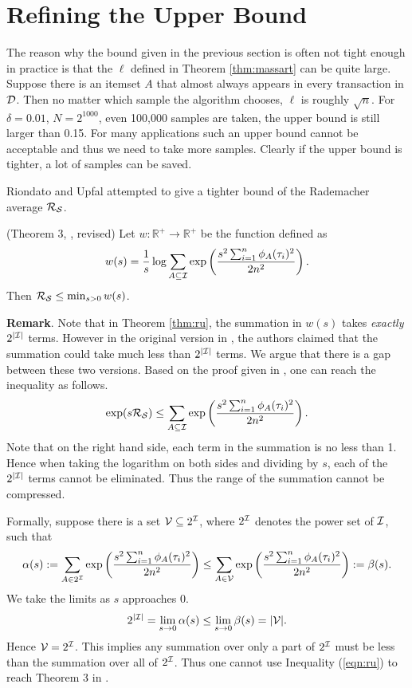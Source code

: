 \documentclass{article}
\begin{document}
\section{Refining the Upper Bound}
\label{sec:refine}
The reason why the bound given in the previous section is often not tight enough in practice is that the $\ell$ defined in Theorem \ref{thm:massart} can be quite large. Suppose there is an itemset $A$ that almost always appears in every transaction in $\mathcal{D}$. Then no matter which sample the algorithm chooses, $\ell$ is roughly $\sqrt{n}$. For $\delta=0.01$, $N = 2^{1000}$, even 100,000 samples are taken, the upper bound is still larger than 0.15. For many applications such an upper bound cannot be acceptable and thus we need to take more samples. Clearly if the upper bound is tighter, a lot of samples can be saved.

Riondato and Upfal \cite{RU15} attempted to give a tighter bound of the Rademacher average $\mathcal{R}_{\mathcal{S}}$. 

\begin{theorem}
\label{thm:ru}
(Theorem 3, \cite{RU15}, revised) Let $w : \mathbb{R}^+ \to \mathbb{R}^+$ be the function defined as
$$w(s) = \frac{1}{s}\log \sum_{A\subseteq\mathcal{I}}\exp\left(\frac{s^2 \sum_{i=1}^n \phi_A(\tau_i)^2}{2n^2}\right).$$
Then $\mathcal{R}_{\mathcal{S}} \leq \min_{s>0} w(s)$.
\end{theorem}

{\bf Remark}. Note that in Theorem \ref{thm:ru}, the summation in $w(s)$ takes \emph{exactly} $2^{|\mathcal{I}|}$ terms. However in the original version in \cite{RU15}, the authors claimed that the summation could take much less than $2^{|\mathcal{I}|}$ terms. We argue that there is a gap between these two versions. Based on the proof given in \cite{RU15}, one can reach the inequality as follows.
\begin{equation}
\label{eqn:ru}\exp(s\mathcal{R}_{\mathcal{S}}) \leq \sum_{A\subseteq\mathcal{I}}\exp\left(\frac{s^2\sum_{i=1}^n \phi_A(\tau_i)^2}{2n^2}\right).
\end{equation}
Note that on the right hand side, each term in the summation is no less than 1. Hence when taking the logarithm on both sides and dividing by $s$, each of the $2^{|\mathcal{I}|}$ terms cannot be eliminated. Thus the range of the summation cannot be compressed.

Formally, suppose there is a set $\mathcal{V}\subseteq 2^{\mathcal{I}}$, where $2^{\mathcal{I}}$ denotes the power set of $\mathcal{I}$, such that
$$\alpha(s) := \sum_{A\in 2^{\mathcal{I}}}\exp\left(\frac{s^2\sum_{i=1}^n \phi_A(\tau_i)^2}{2n^2}\right) \leq \sum_{A\in \mathcal{V}}\exp\left(\frac{s^2\sum_{i=1}^n \phi_A(\tau_i)^2}{2n^2}\right) :=\beta(s).$$
We take the limits as $s$ approaches 0.
$$2^{|\mathcal{I}|}=\lim_{s\to 0}\alpha(s) \leq \lim_{s\to 0}\beta(s) = |\mathcal{V}|.$$
Hence $\mathcal{V} = 2^{\mathcal{I}}$. This implies any summation over only a part of $2^{\mathcal{I}}$ must be less than the summation over all of $2^{\mathcal{I}}$. Thus one cannot use Inequality (\ref{eqn:ru}) to reach Theorem 3 in \cite{RU15}.
\end{document}
